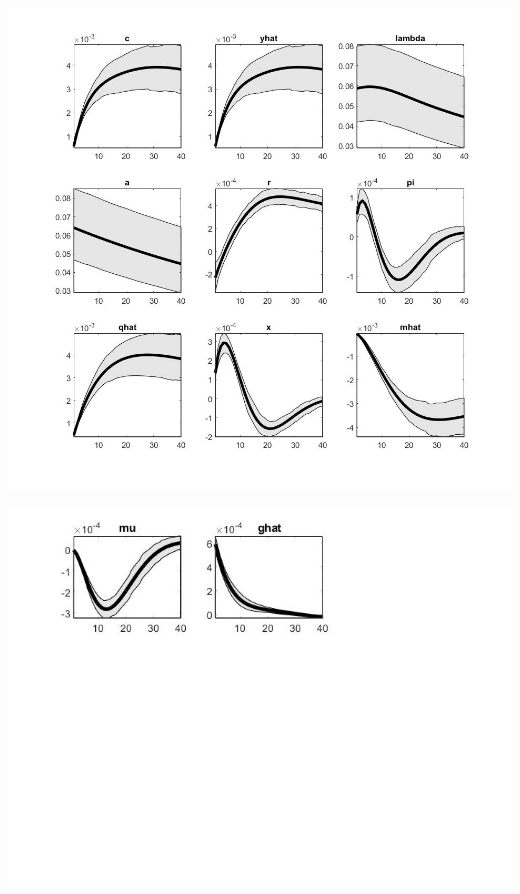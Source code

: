 \documentclass[11pt,preprint, authoryear]{elsarticle}
\let\origfigure\figure
\let\endorigfigure\endfigure
\renewenvironment{figure}[1][2] {
    \expandafter\origfigure\expandafter[H]
} {
    \endorigfigure
}
\numberwithin{equation}{section}
\numberwithin{figure}{section}
\numberwithin{table}{section}
\begin{document}
\begin{figure}
    \centering 
    \begin{minipage}[t]{8.2cm} 
        \centering 
        \includegraphics[width=\linewidth]{flex_a1.jpg} 
    \end{minipage} 
    \hspace{0.1cm} 
    \begin{minipage}[t]{8.2cm} 
        \centering 
        \includegraphics[width=\linewidth]{flex_a2.jpg} 
    \end{minipage}
    \caption{Orthogonalized Shock to Preference Shock - Flexible Money Growth Rule}
    \label{flex_a}
\end{figure}
\end{document}
